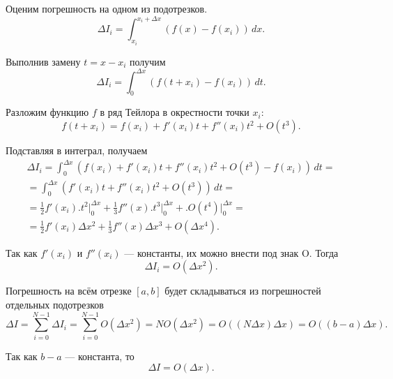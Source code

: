 

\Theory


Оценим погрешность на одном из подотрезков.
\[
\Delta I_i = \int_{x_i}^{x_i+\Delta x} (f(x) - f(x_i))\,dx.
\]

Выполнив замену $t = x - x_i$ получим
\[
\Delta I_i = \int_0^{\Delta x} (f(t + x_i) - f(x_i))\, dt.
\]

Разложим функцию $f$ в ряд Тейлора в окрестности точки $x_i$:
\[
    f(t + x_i) = f(x_i) + f'(x_i)t + f''(x_i)t^2 + O(t^3).
\]

Подставляя в интеграл, получаем
\begin{multline*}
\Delta I_i = \int_0^{\Delta x} \left(f(x_i) + f'(x_i)t + f''(x_i)t^2 + O(t^3) - f(x_i)\right)\,dt =\\
=\int_0^{\Delta x}\left(f'(x_i)t + f''(x_i)t^2 + O(t^3)\right)\,dt=\\
=\frac12 f'(x_i) \bigl. t^2 \bigr|_{0}^{\Delta x} + \frac13 f''(x) \bigl. t^3 \bigr|_{0}^{\Delta x} +  \bigl.O(t^4) \bigr|_{0}^{\Delta x}=\\
=\frac12 f'(x_i) \Delta x^2 + \frac13 f''(x) \Delta x^3 + O(\Delta x^4).
\end{multline*}

Так как $f'(x_i)$ и $f''(x_i)$ — константы, их можно внести под знак O. Тогда
\[
\Delta I_i = O(\Delta x^2).
\]

Погрешность на всём отрезке $[a, b]$ будет складываться из погрешностей отдельных подотрезков
\[
\Delta I = \sum_{i=0}^{N-1}\Delta I_i = \sum_{i=0}^{N-1}O(\Delta x^2) = N O(\Delta x^2) = O((N \Delta x) \Delta x) = O((b-a)\Delta x).
\]

Так как $b-a$ — константа, то
\[
\Delta I = O(\Delta x).
\]

\Practice

\Tasks

\Questions
